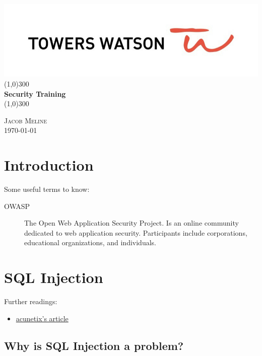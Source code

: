 \documentclass[a4paper, titlepage]{article}
\begin{document}
\begin{titlepage}
    \begin{center}
        \includegraphics[width=0.5\linewidth]{Towers-watson}
        \line(1,0){300} \\
        [0.25in]
        \huge{\bfseries Security Training} \\
        [2mm]
        \line(1,0){300} \\
        [10cm]
    \end{center}
    \begin{flushright}
        \textsc{\large Jacob Meline } \\
        \today
    \end{flushright}
\end{titlepage}

\tableofcontents
\thispagestyle{empty}
\cleardoublepage
\setcounter{page}{1}

\section{Introduction}\label{sec:intro}
Some useful terms to know:
\begin{description}
    \item[OWASP] The Open Web Application Security Project. Is an online community dedicated to web application security. Participants include corporations, educational organizations, and individuals.

\end{description}

\newpage

\section{SQL Injection}

Further readings:

\begin{itemize}
    \item \href{https://www.acunetix.com/websitesecurity/sql-injection/}{acunetix's article}
\end{itemize}

\subsection{Why is SQL Injection a problem?}
\end{document}
